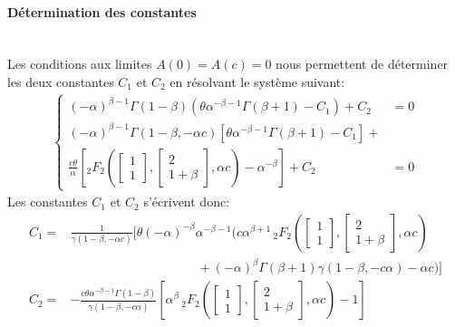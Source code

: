 \paragraph{Détermination des constantes}\phantom{}\\
Les conditions aux limites $A(0)=A(c)=0$ nous permettent de déterminer les deux constantes $C_1$ et $C_2$ en résolvant le système suivant: 
\begin{align*}
\left\{\begin{aligned}
    {(-\alpha)}^{\beta-1}\Gamma(1-\beta)(\theta\alpha^{-\beta-1}\Gamma(\beta+1)-C_1)+C_2 &= 0 \\
    {(-\alpha)}^{\beta-1}\Gamma(1-\beta,-\alpha c)[\theta\alpha^{-\beta-1}\Gamma(\beta+1)-C_1]+\\ \frac{c\theta}{\alpha}\left[{}_2F_2\left(\begin{bmatrix}1\\1\end{bmatrix},\begin{bmatrix}2\\1+\beta\end{bmatrix},\alpha c\right)-\alpha^{-\beta}\right] +C_2 &=0
\end{aligned}\right.
\end{align*}
Les constantes $C_1$ et $C_2$ s'écrivent donc: 
\begin{equation}\label{area_constants}
    \begin{aligned}
        C_1 =& \frac{1}{\gamma (1-\beta ,-\alpha c)}\Bigg[\theta  {(-\alpha)}^{-\beta } \alpha ^{-\beta -1} \bigg(c \alpha ^{\beta +1} \,{}_2F_2\left(\begin{bmatrix}1\\1\end{bmatrix},\begin{bmatrix}2\\1+\beta\end{bmatrix},\alpha c\right)\\&\quad\quad\quad\quad\quad\quad\quad\quad\quad\quad+
        {(-\alpha)}^{\beta } \Gamma(\beta +1)\gamma (1-\beta ,-c \alpha )-\alpha  c\bigg)\Bigg] \\
        C_2 =& -\frac{c \theta  \alpha ^{-\beta -1} \Gamma (1-\beta ) }{\gamma(1-\beta ,-c \alpha )}\left[\alpha ^{\beta } \,{}_2F_2\left(\begin{bmatrix}1\\1\end{bmatrix},\begin{bmatrix}2\\1+\beta\end{bmatrix},\alpha c\right)-1\right]
    \end{aligned}
\end{equation}

